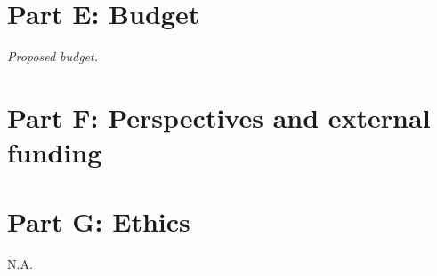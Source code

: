 \section{Part E: Budget}

\textit{Proposed budget.}

\section{Part F: Perspectives and external funding}


\section{Part G: Ethics}
N.A.

\clearpage


